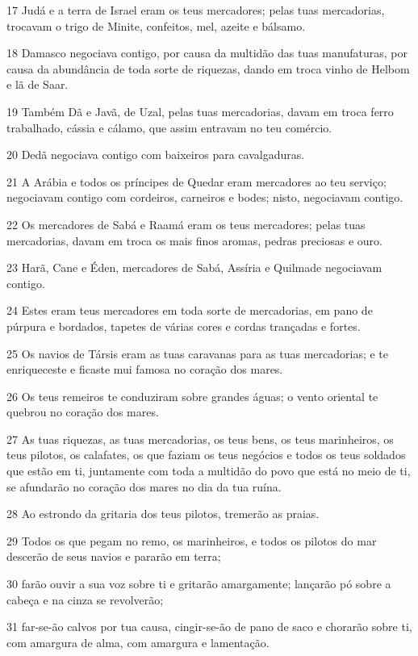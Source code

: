 \par 17 Judá e a terra de Israel eram os teus mercadores; pelas tuas mercadorias, trocavam o trigo de Minite, confeitos, mel, azeite e bálsamo.
\par 18 Damasco negociava contigo, por causa da multidão das tuas manufaturas, por causa da abundância de toda sorte de riquezas, dando em troca vinho de Helbom e lã de Saar.
\par 19 Também Dã e Javã, de Uzal, pelas tuas mercadorias, davam em troca ferro trabalhado, cássia e cálamo, que assim entravam no teu comércio.
\par 20 Dedã negociava contigo com baixeiros para cavalgaduras.
\par 21 A Arábia e todos os príncipes de Quedar eram mercadores ao teu serviço; negociavam contigo com cordeiros, carneiros e bodes; nisto, negociavam contigo.
\par 22 Os mercadores de Sabá e Raamá eram os teus mercadores; pelas tuas mercadorias, davam em troca os mais finos aromas, pedras preciosas e ouro.
\par 23 Harã, Cane e Éden, mercadores de Sabá, Assíria e Quilmade negociavam contigo.
\par 24 Estes eram teus mercadores em toda sorte de mercadorias, em pano de púrpura e bordados, tapetes de várias cores e cordas trançadas e fortes.
\par 25 Os navios de Társis eram as tuas caravanas para as tuas mercadorias; e te enriqueceste e ficaste mui famosa no coração dos mares.
\par 26 Os teus remeiros te conduziram sobre grandes águas; o vento oriental te quebrou no coração dos mares.
\par 27 As tuas riquezas, as tuas mercadorias, os teus bens, os teus marinheiros, os teus pilotos, os calafates, os que faziam os teus negócios e todos os teus soldados que estão em ti, juntamente com toda a multidão do povo que está no meio de ti, se afundarão no coração dos mares no dia da tua ruína.
\par 28 Ao estrondo da gritaria dos teus pilotos, tremerão as praias.
\par 29 Todos os que pegam no remo, os marinheiros, e todos os pilotos do mar descerão de seus navios e pararão em terra;
\par 30 farão ouvir a sua voz sobre ti e gritarão amargamente; lançarão pó sobre a cabeça e na cinza se revolverão;
\par 31 far-se-ão calvos por tua causa, cingir-se-ão de pano de saco e chorarão sobre ti, com amargura de alma, com amargura e lamentação.
